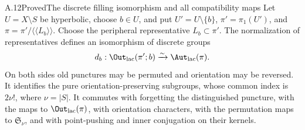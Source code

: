 \begin{claim}{A.12}{Proved}{The discrete filling isomorphism and all compatibility maps}
Let $U=X\setminus S$ be hyperbolic, choose $b\in U$, and put $U'=U\setminus\{b\}$, $\pi'=\pi_1(U')$, and $\pi=\pi'/\langle\!\langle L_b\rangle\!\rangle$. Choose the peripheral representative $L_b\subset\pi'$. The normalization of representatives defines an isomorphism of discrete groups
\[
 d_b:\Out_{\mathrm{lac}}(\pi';b)\xrightarrow{\sim}\Aut_{\mathrm{lac}}(\pi).
\]
On both sides old punctures may be permuted and orientation may be reversed. It identifies the pure orientation-preserving subgroups, whose common index is $2\nu!$, where $\nu=|S|$. It commutes with forgetting the distinguished puncture, with the maps to $\Out_{\mathrm{lac}}(\pi)$, with orientation characters, with the permutation maps to $\mathfrak S_\nu$, and with point-pushing and inner conjugation on their kernels.
\end{claim}
